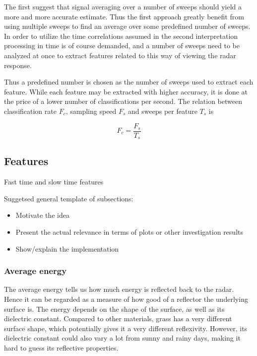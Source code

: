\documentclass[a4paper, 12pt]{article}
\begin{document}
The first suggest that signal averaging over a number of sweeps should yield a more and more accurate estimate. Thus the first approach greatly benefit from using multiple sweeps to find an average over some predefined number of sweeps.  In order to utilize the time correlations assumed in the second interpretation processing in time is of course demanded, and a number of sweeps need to be analyzed at once to extract features related to this way of viewing the radar response. 

Thus a predefined number is chosen as the number of sweeps used to extract each feature. While each feature may be extracted with higher accuracy, it is done at the price of a lower number of classifications per second. The relation between classification rate $F_c$, sampling speed $F_s$ and sweeps per feature $T_s$ is



\begin{equation}
	F_c = \frac{F_s}{T_s}
\end{equation}

\subsection{Features}

Fast time and slow time features 

Suggetsed general template of subsections: 
\begin{itemize}
	\item{Motivate the idea}
	\item{Present the actual relevance in terms of plots or other investigation results}
	\item{Show/explain the implementation}
\end{itemize}

\subsubsection{Average energy}
The average energy tells us how much energy is reflected back to the radar. Hence it can be regarded as a measure of how good of a reflector the underlying surface is. The energy depends on the shape of the surface, as well as its dielectric constant. Compared to other materials, grass has a very different surface shape, which potentially gives it a very different reflexivity. However, its dielectric constant could also vary a lot from sunny and rainy days, making it hard to guess its reflective properties.
\end{document}
